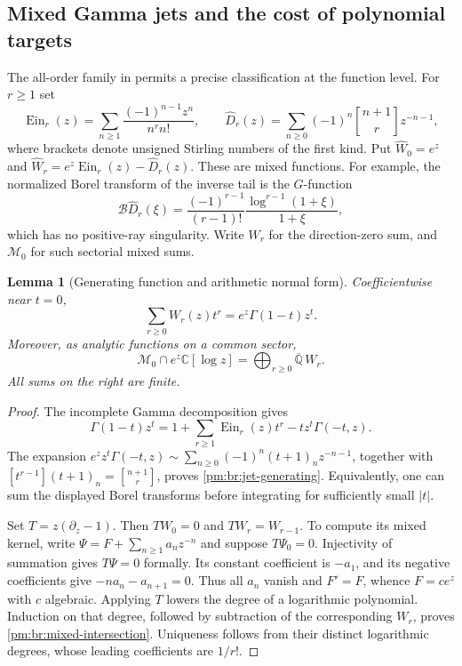 \documentclass[11pt,a4paper]{article}
\newtheorem{lemma}[theorem]{Lemma}
\theoremstyle{definition}
\theoremstyle{remark}
\numberwithin{equation}{section}
\begin{document}
\subsection{Mixed Gamma jets and the cost of polynomial targets}

The all-order family in \cite{pm:KEIO002} permits a precise classification
at the function level.  For \(r\geq1\) set
\[
 \operatorname{Ein}_r(z)=\sum_{n\geq1}\frac{(-1)^{n-1}z^n}{n^r n!},
 \qquad
 \widehat D_r(z)=\sum_{n\geq0}(-1)^n
                  \genfrac{[}{]}{0pt}{}{n+1}{r}z^{-n-1},
\]
where brackets denote unsigned Stirling numbers of the first kind.  Put
\(\widehat W_0=e^z\) and
\(\widehat W_r=e^z\operatorname{Ein}_r(z)-\widehat D_r(z)\).
These are mixed functions.  For example, the normalized Borel transform
of the inverse tail is the \(G\)-function
\[
 \mathcal B\widehat D_r(\xi)
  =\frac{(-1)^{r-1}}{(r-1)!}
         \frac{\log^{r-1}(1+\xi)}{1+\xi},
\]
which has no positive-ray singularity.  Write \(W_r\) for the
direction-zero sum, and \(\mathcal M_0\) for such sectorial mixed sums.

\begin{lemma}[Generating function and arithmetic normal form]
\label{pm:br:normal-form}
Coefficientwise near \(t=0\),
\begin{equation}\label{pm:br:jet-generating}
 \sum_{r\geq0}W_r(z)t^r=e^z\Gamma(1-t)z^t.
\end{equation}
Moreover, as analytic functions on a common sector,
\begin{equation}\label{pm:br:mixed-intersection}
 \mathcal M_0\cap e^z\mathbb C[\log z]
        =\bigoplus_{r\geq0}\overline{\mathbb Q}\,W_r.
\end{equation}
All sums on the right are finite.
\end{lemma}

\begin{proof}
The incomplete Gamma decomposition gives
\[
 \Gamma(1-t)z^t
   =1+\sum_{r\geq1}\operatorname{Ein}_r(z)t^r
                         -t z^t\Gamma(-t,z).
\]
The expansion
\(e^zz^t\Gamma(-t,z)\sim
\sum_{n\geq0}(-1)^n(t+1)_nz^{-n-1}\), together with
\([t^{r-1}](t+1)_n=\genfrac{[}{]}{0pt}{}{n+1}{r}\), proves
\eqref{pm:br:jet-generating}.  Equivalently, one can sum the displayed
Borel transforms before integrating for sufficiently small \(|t|\).

Set \(T=z(\partial_z-1)\).  Then \(TW_0=0\) and
\(TW_r=W_{r-1}\).  To compute its mixed kernel, write
\(\Psi=F+\sum_{n\geq1}a_nz^{-n}\) and suppose \(T\Psi_0=0\).
Injectivity of summation gives \(T\Psi=0\) formally.  Its constant
coefficient is \(-a_1\), and its negative coefficients give
\(-na_n-a_{n+1}=0\).  Thus all \(a_n\) vanish and
\(F'=F\), whence \(F=c e^z\) with \(c\) algebraic.  Applying \(T\)
lowers the degree of a logarithmic polynomial.  Induction on that degree,
followed by subtraction of the corresponding \(W_r\), proves
\eqref{pm:br:mixed-intersection}.  Uniqueness follows from their distinct
logarithmic degrees, whose leading coefficients are \(1/r!\).
\end{proof}
\end{document}
